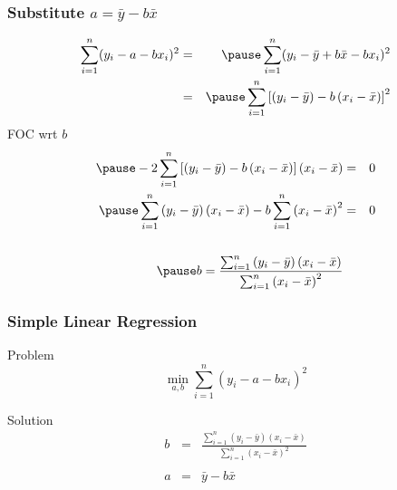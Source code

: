 \documentclass[handout]{beamer}
\begin{document}
\begin{frame}
  \frametitle{Substitute $a = \bar{y} - b \bar{x}$}
  \small
\begin{eqnarray*}
	\sum_{i=1}^n (y_i - a - b x_i)^2 &=& \pause\sum_{i=1}^n (y_i - \bar{y} + b\bar{x} - b x_i)^2\\
	&=&\pause\sum_{i=1}^n \left[ \left(y_i - \bar{y}\right) - b\left(x_i - \bar{x}\right) \right]^2
\end{eqnarray*}
\alert{FOC wrt $b$}
\begin{eqnarray*}\pause
	-2\sum_{i=1}^n \left[\left(y_i - \bar{y}\right) - b\left(x_i - \bar{x}\right) \right]\left(x_i - \bar{x} \right) &=& 0\\\pause
	\sum_{i=1}^n \left(y_i - \bar{y}\right)\left(x_i - \bar{x} \right) - b\sum_{i=1}^n \left(x_i - \bar{x}\right)^2 &=& 0\\ \\\pause
	b = \frac{\sum_{i=1}^n \left(y_i - \bar{y}\right)\left(x_i - \bar{x} \right)}{\sum_{i=1}^n \left(x_i - \bar{x}\right)^2}
\end{eqnarray*}
\end{frame}
\begin{frame}
\frametitle{Simple Linear Regression}
	\begin{block}{Problem}
	$$\min_{a,b}  \sum_{i=1}^n (y_i - a - b x_i)^2$$
\end{block}
\begin{block}{Solution}
	\begin{eqnarray*}
		b &=& \frac{\sum_{i=1}^n \left(y_i - \bar{y}\right)\left(x_i - \bar{x} \right)}{\sum_{i=1}^n \left(x_i - \bar{x}\right)^2}\\ \\
		a &=& \bar{y} - b\bar{x}
	\end{eqnarray*}
\end{block}
\end{frame}
\end{document}
